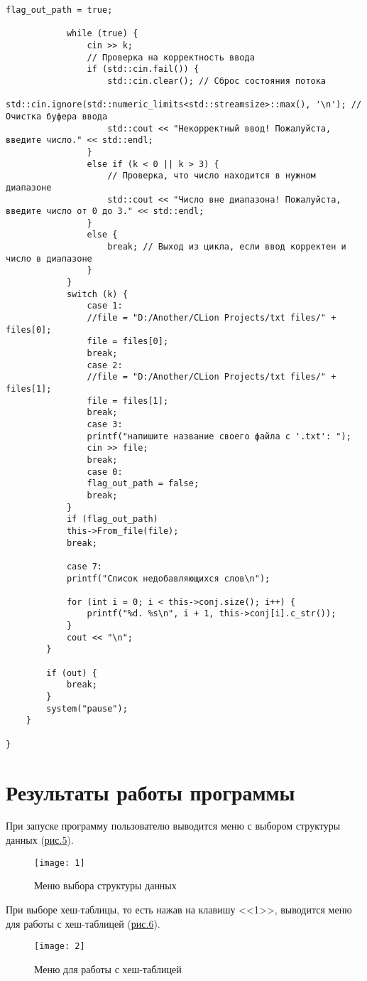 \documentclass[10pt,a4paper,final]{article} %
\begin{document}
\begin{lstlisting}[label=menuMethod, caption = Метод Menu для класса Tree]
			flag_out_path = true;

			while (true) {
				cin >> k;
				// Проверка на корректность ввода
				if (std::cin.fail()) {
					std::cin.clear(); // Сброс состояния потока
					std::cin.ignore(std::numeric_limits<std::streamsize>::max(), '\n'); // Очистка буфера ввода
					std::cout << "Некорректный ввод! Пожалуйста, введите число." << std::endl;
				}
				else if (k < 0 || k > 3) {
					// Проверка, что число находится в нужном диапазоне
					std::cout << "Число вне диапазона! Пожалуйста, введите число от 0 до 3." << std::endl;
				}
				else {
					break; // Выход из цикла, если ввод корректен и число в диапазоне
				}
			}
			switch (k) {
				case 1:
				//file = "D:/Another/CLion Projects/txt files/" + files[0];
				file = files[0];
				break;
				case 2:
				//file = "D:/Another/CLion Projects/txt files/" + files[1];
				file = files[1];
				break;
				case 3:
				printf("напишите название своего файла с '.txt': ");
				cin >> file;
				break;
				case 0:
				flag_out_path = false;
				break;
			}
			if (flag_out_path)
			this->From_file(file);
			break;
			
			case 7:
			printf("Cписок недобавляющихся слов\n");
			
			for (int i = 0; i < this->conj.size(); i++) {
				printf("%d. %s\n", i + 1, this->conj[i].c_str());
			}
			cout << "\n";
		}
		
		if (out) {
			break;
		}
		system("pause");
	}
	
}\end{lstlisting}


\newpage
\section{Результаты работы программы}
При запуске программу пользователю выводится меню с выбором структуры данных (\hyperref[fig:1]{рис.5}).

\begin{figure}[htbp]
	\centering
	\texttt{[image: 1]}
	\caption{Меню выбора структуры данных}
	\label{fig:1}
\end{figure}

При выборе хеш-таблицы, то есть нажав на клавишу <<1>>, выводится меню для работы с хеш-таблицей (\hyperref[fig:2]{рис.6}).
\begin{figure}[htbp]
	\centering
	\texttt{[image: 2]}
	\caption{Меню для работы с хеш-таблицей}
	\label{fig:2}
\end{figure}
\end{document}
